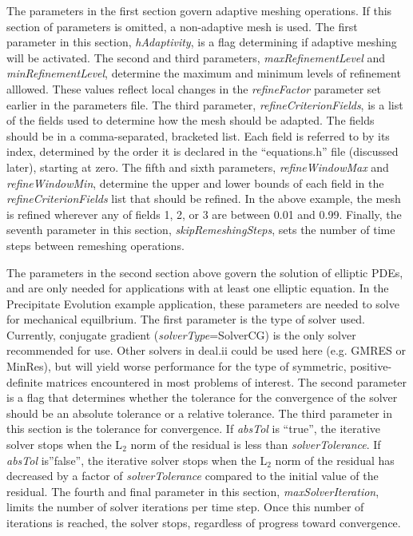 \documentclass[10pt]{article} %
\begin{document}
The parameters in the first section govern adaptive meshing operations. If this section of parameters is omitted, a non-adaptive mesh is used. The first parameter in this section, \emph{hAdaptivity}, is a flag determining if adaptive meshing will be activated. The second and third parameters, \emph{maxRefinementLevel} and \emph{minRefinementLevel}, determine the maximum and minimum  levels of refinement alllowed. These values reflect local changes in the \emph{refineFactor} parameter set earlier in the parameters file. The third parameter, \emph{refineCriterionFields}, is a list of the fields used to determine how the mesh should be adapted. The fields should be in a comma-separated, bracketed list. Each field is referred to by its index, determined by the order it is declared in the ``equations.h'' file (discussed later), starting at zero. The fifth and sixth parameters, \emph{refineWindowMax} and \emph{refineWindowMin}, determine the upper and lower bounds of each field in the \emph{refineCriterionFields} list that should be refined. In the above example, the mesh is refined wherever any of fields 1, 2, or 3 are between 0.01 and 0.99. Finally, the seventh parameter in this section, \emph{skipRemeshingSteps}, sets the number of time steps between remeshing operations.

The parameters in the second section above govern the solution of elliptic PDEs, and are only needed for applications with at least one elliptic equation. In the Precipitate Evolution example application, these parameters are needed to solve for mechanical equilbrium. The first parameter is the type of solver used. Currently, conjugate gradient (\emph{solverType}=SolverCG) is the only solver recommended for use. Other solvers in deal.ii could be used here (e.g. GMRES or MinRes), but will yield worse performance for the type of symmetric, positive-definite matrices encountered in most problems of interest. The second parameter is a flag that determines whether the tolerance for the convergence of the solver should be an absolute tolerance or a relative tolerance. The third parameter in this section is the tolerance for convergence. If \emph{absTol} is ``true'', the iterative solver stops when the L$_2$ norm of the residual is less than \emph{solverTolerance}. If \emph{absTol} is''false'', the iterative solver stops when the L$_2$ norm of the residual has decreased by a factor of \emph{solverTolerance} compared to the initial value of the residual. The fourth and final parameter in this section, \emph{maxSolverIteration}, limits the number of solver iterations per time step. Once this number of iterations is reached, the solver stops, regardless of progress toward convergence.
\end{document}
